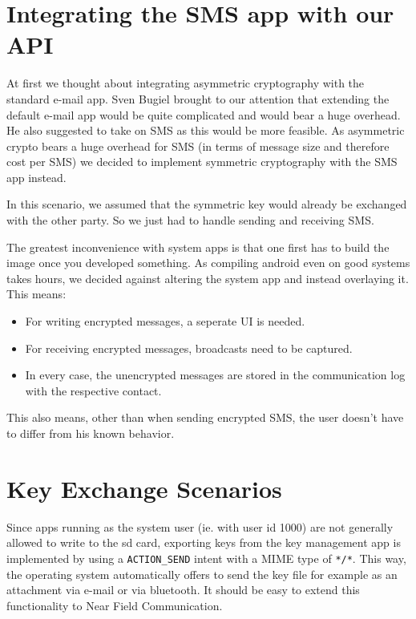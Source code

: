 \documentclass[a4paper,draft]{scrartcl}
\begin{document}
\section{Integrating the SMS app with our API}
	\label{sec-sms-app}
	At first we thought about integrating asymmetric cryptography with the standard e-mail app. Sven Bugiel brought to our attention that extending the default e-mail app would be quite complicated and would bear a huge overhead. He also suggested to take on SMS as this would be more feasible. As asymmetric crypto bears a huge overhead for SMS (in terms of message size and therefore cost per SMS) we decided to implement symmetric cryptography with the SMS app instead. %
	
	In this scenario, we assumed that the symmetric key would already be exchanged with the other party. So we just had to handle sending and receiving SMS.
	
	The greatest inconvenience with system apps is that one first has to build the image once you developed something. As compiling android even on good systems takes hours, we decided against altering the system app and instead overlaying it. This means:
	\begin{itemize}
		\item For writing encrypted messages, a seperate UI is needed.
		\item For receiving encrypted messages, broadcasts need to be captured.
		\item In every case, the unencrypted messages are stored in the communication log with the respective contact.
	\end{itemize}
	This also means, other than when sending encrypted SMS, the user doesn't have to differ from his known behavior.
	
\section{Key Exchange Scenarios}
	Since apps running as the system user (ie. with user id 1000) are not generally allowed to write to the sd card,
	exporting keys from the key management app is implemented by using a \texttt{ACTION\_SEND} intent with a MIME type
	of \texttt{*/*}. This way, the operating system automatically offers to send the key file for example as an attachment
	via e-mail or via bluetooth. It should be easy to extend this functionality to Near Field Communication.
\end{document}
